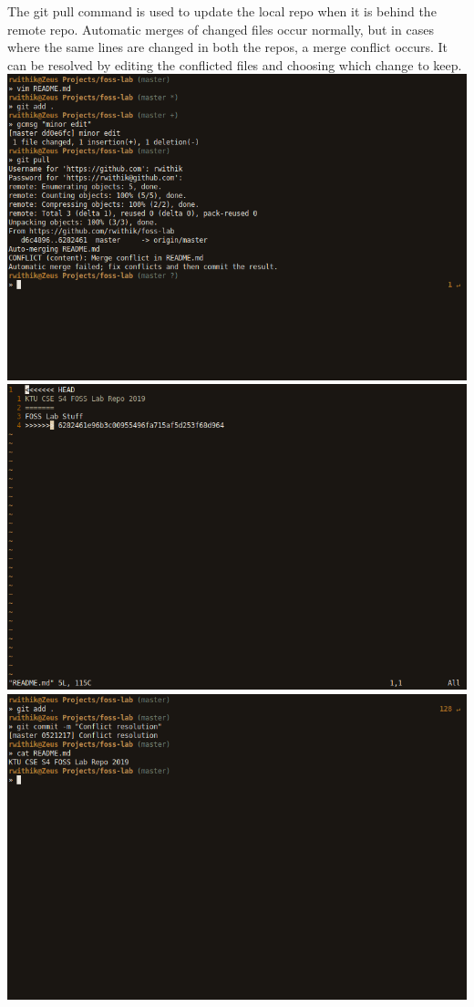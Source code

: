 \documentclass[10pt,a4paper,titlepage]{report}
\begin{document}
\par The {\color{red} git pull} command is used to update the local repo when it is behind the remote repo. Automatic merges of changed files occur normally, but in cases where the same lines are changed in both the repos, a merge conflict occurs. It can be resolved by editing the conflicted files and choosing which change to keep. \newline\newline
\includegraphics[scale=.45]{../Images/VCS/7.png}\newline\newline
\includegraphics[scale=.45]{../Images/VCS/8.png}\newline\newline
\includegraphics[scale=.45]{../Images/VCS/9.png}
\end{document}
